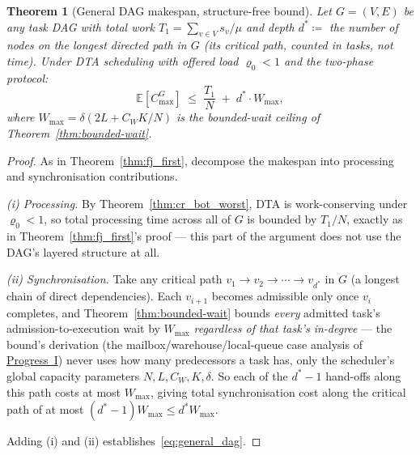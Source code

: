\documentclass[11pt,a4paper]{report}
\newtheorem{theorem}{Theorem}[section]
\begin{document}
\begin{theorem}[General DAG makespan, structure-free bound]
\label{thm:general_dag}
Let $G=(V,E)$ be any task DAG with total work
$T_1 = \sum_{v \in V} s_v/\mu$ and \emph{depth} $d^* \coloneqq$ the
number of nodes on the longest directed path in $G$ (its critical
path, counted in tasks, not time). Under DTA scheduling with offered
load $\varrho_0 < 1$ and the two-phase protocol:
\begin{equation}\label{eq:general_dag}
  \mathbb{E}[C_{\max}^G] \;\leq\; \frac{T_1}{N} \;+\; d^* \cdot W_{\max},
\end{equation}
where $W_{\max} = \delta(2L + C_WK/N)$ is the bounded-wait ceiling of
Theorem~\ref{thm:bounded-wait}.
\end{theorem}

\begin{proof}
As in Theorem~\ref{thm:fj_first}, decompose the makespan into
processing and synchronisation contributions.

\emph{(i) Processing.} By Theorem~\ref{thm:cr_bot_worst}, DTA is
work-conserving under $\varrho_0 < 1$, so total processing time across
all of $G$ is bounded by $T_1/N$, exactly as in
Theorem~\ref{thm:fj_first}'s proof --- this part of the argument does
not use the DAG's layered structure at all.

\emph{(ii) Synchronisation.} Take any critical path
$v_1 \to v_2 \to \cdots \to v_{d^*}$ in $G$ (a longest chain of direct
dependencies). Each $v_{i+1}$ becomes admissible only once $v_i$
completes, and Theorem~\ref{thm:bounded-wait} bounds \emph{every}
admitted task's admission-to-execution wait by $W_{\max}$
\emph{regardless of that task's in-degree} --- the bound's derivation
(the mailbox/warehouse/local-queue case analysis of
\hyperref[chap:bounded_wait]{Progress~I}) never uses how many
predecessors a task has, only the scheduler's global capacity
parameters $N,L,C_W,K,\delta$. So each of the $d^*-1$ hand-offs along
this path costs at most $W_{\max}$, giving total synchronisation cost
along the critical path of at most $(d^*-1)W_{\max} \leq d^*W_{\max}$.

Adding (i) and (ii) establishes~\eqref{eq:general_dag}.
\end{proof}
\end{document}
